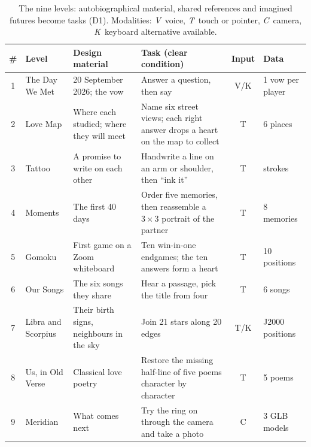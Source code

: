\documentclass[sigconf,nonacm]{acmart}
\newcommand{\zh}[1]{\begingroup\normalfont\begin{CJK*}{UTF8}{gbsn}#1\end{CJK*}\endgroup}
\newcommand{\dc}[1]{\textsc{D#1}}
\begin{document}
\begin{table}[t]
  \caption{The nine levels: autobiographical material, shared references and imagined futures become tasks (\dc{1}). Modalities: \emph{V}~voice,
  \emph{T}~touch or pointer, \emph{C}~camera, \emph{K}~keyboard alternative available.}
  \label{tab:levels}
  \small
  \begin{tabular}{@{}clp{}p{}cl@{}}
    \toprule
    \# & Level & Design material & Task (clear condition) & Input & Data \\
    \midrule
    1 & The Day We Met & 20 September 2026; the vow & Answer a question, then say \emph{\zh{我爱你，<name>，我愿意}} aloud; homophones of the name accepted & V/K & 1 vow per player \\
    2 & Love Map & Where each studied; where they will meet & Name six street views; each right answer drops a heart on the map to collect & T & 6 places \\
    3 & Tattoo & A promise to write on each other & Handwrite a line on an arm or shoulder, then ``ink it'' & T & strokes \\
    4 & Moments & The first 40 days & Order five memories, then reassemble a $3\times3$ portrait of the partner & T & 8 memories \\
    5 & Gomoku & First game on a Zoom whiteboard & Ten win-in-one endgames; the ten answers form a heart & T & 10 positions \\
    6 & Our Songs & The six songs they share & Hear a passage, pick the title from four & T & 6 songs \\
    7 & Libra and Scorpius & Their birth signs, neighbours in the sky & Join 21 stars along 20 edges & T/K & J2000 positions \\
    8 & Us, in Old Verse & Classical love poetry & Restore the missing half-line of five poems character by character & T & 5 poems \\
    9 & Meridian & What comes next & Try the ring on through the camera and take a photo & C & 3 GLB models \\
    \bottomrule
  \end{tabular}
\end{table}
\end{document}
